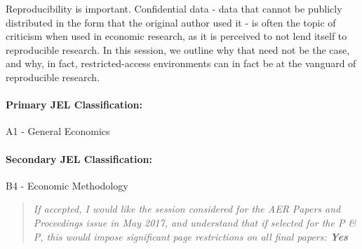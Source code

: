                       
Reproducibility is important. Confidential data  - data that cannot be publicly distributed in the form that the original author used it - is often the topic of criticism when used in economic research, as it is perceived to not lend itself to reproducible research. In this session, we outline why that need not be the case, and why, in fact, restricted-access environments can in fact be at the vanguard of reproducible research.

\paragraph{Primary JEL Classification:} A1 - General Economics
\paragraph{Secondary JEL Classification:} B4 - Economic Methodology


\begin{quote}
\it	If accepted, I would like the session considered for the AER Papers and Proceedings issue in May 2017, and understand that if selected for the P \& P, this would impose significant page restrictions on all final papers: \textbf{Yes}

\end{quote}
